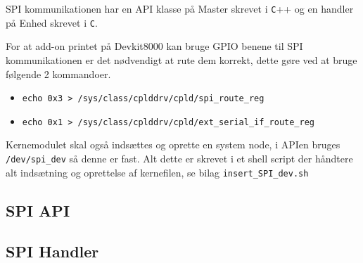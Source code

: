 


SPI kommunikationen har en API klasse på Master skrevet i \verb+C+++ og en handler på Enhed skrevet i \verb+C+.

For at add-on printet på Devkit8000 kan bruge GPIO benene til SPI kommunikationen er det nødvendigt at rute dem korrekt, dette gøre ved at bruge følgende 2 kommandoer.

\begin{itemize}
\item \verb+echo 0x3 > /sys/class/cplddrv/cpld/spi_route_reg+
\item \verb+echo 0x1 > /sys/class/cplddrv/cpld/ext_serial_if_route_reg+
\end{itemize}

Kernemodulet skal også indsættes og oprette en system node, i APIen bruges \verb+/dev/spi_dev+ så denne er fast.
Alt dette er skrevet i et shell script der håndtere alt indsætning og oprettelse af kernefilen, se bilag \verb+insert_SPI_dev.sh+


\subsection{SPI API}
%



\subsection{SPI Handler}



